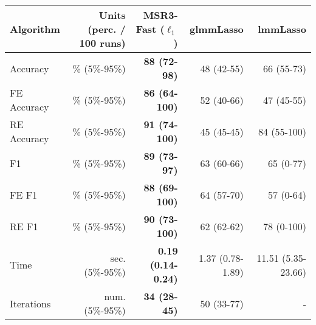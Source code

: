 \begin{tabular}{lrrrr}
\toprule
Algorithm & Units (perc. / 100 runs) &         MSR3-Fast ($\ell_1$)&         glmmLasso &            lmmLasso \\
\midrule
Accuracy &\% (5\%-95\%)    &        {\bf 88 (72-98)} &        48 (42-55) &          66 (55-73) \\
FE Accuracy &\% (5\%-95\%) &      {\bf 86 (64-100)} &        52 (40-66) &          47 (45-55) \\
RE Accuracy &\% (5\%-95\%) &       {\bf 91 (74-100)} &        45 (45-45) &         84 (55-100) \\
F1          &\% (5\%-95\%)&        {\bf 89 (73-97)} &        63 (60-66) &           65 (0-77) \\
FE F1       &\% (5\%-95\%)&       {\bf 88 (69-100)} &        64 (57-70) &           57 (0-64) \\
RE F1       &\% (5\%-95\%)&       {\bf 90 (73-100)} &        62 (62-62) &          78 (0-100) \\
Time        &sec. (5\%-95\%)&  {\bf 0.19 (0.14-0.24)} &  1.37 (0.78-1.89) &  11.51 (5.35-23.66) \\
Iterations  & num. (5\%-95\%)&        {\bf 34 (28-45)} &        50 (33-77) &             - \\
\bottomrule
\end{tabular}
